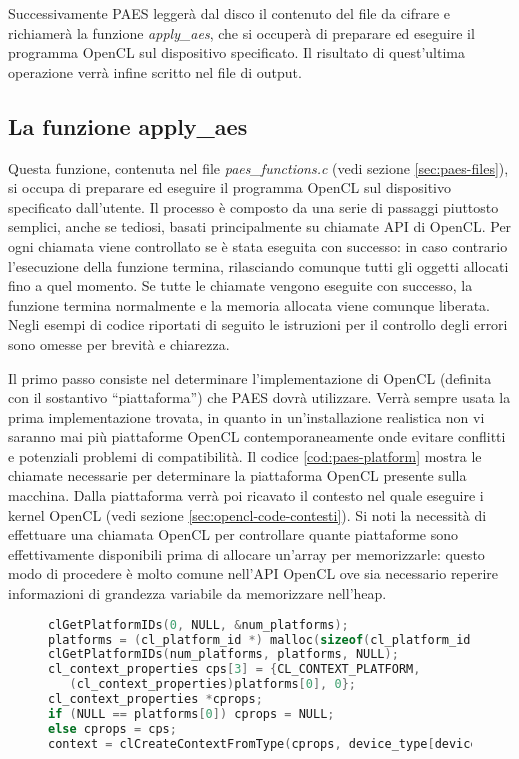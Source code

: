 \documentclass[12pt,a4paper,oneside]{book}
\begin{document}
Successivamente PAES leggerà dal disco il contenuto del file da cifrare e richiamerà la funzione \textit{apply\_aes}, che si occuperà di preparare ed eseguire il programma \ac{OpenCL} sul dispositivo specificato. Il risultato di quest'ultima operazione verrà infine scritto nel file di output.

\subsection{La funzione apply\_aes}
\label{sec:paes-apply-aes}

Questa funzione, contenuta nel file \textit{paes\_functions.c} (vedi sezione \ref{sec:paes-files}), si occupa di preparare ed eseguire il programma \ac{OpenCL} sul dispositivo specificato dall'utente. Il processo è composto da una serie di passaggi piuttosto semplici, anche se tediosi, basati principalmente su chiamate \ac{API} di \ac{OpenCL}. Per ogni chiamata viene controllato se è stata eseguita con successo: in caso contrario l'esecuzione della funzione termina, rilasciando comunque tutti gli oggetti allocati fino a quel momento. Se tutte le chiamate vengono eseguite con successo, la funzione termina normalmente e la memoria allocata viene comunque liberata. Negli esempi di codice riportati di seguito le istruzioni per il controllo degli errori sono omesse per brevità e chiarezza.

Il primo passo consiste nel determinare l'implementazione di \ac{OpenCL} (definita con il sostantivo ``piattaforma'') che PAES dovrà utilizzare. Verrà sempre usata la prima implementazione trovata, in quanto in un'installazione realistica non vi saranno mai più piattaforme \ac{OpenCL} contemporaneamente onde evitare conflitti e potenziali problemi di compatibilità. Il codice \ref{cod:paes-platform} mostra le chiamate necessarie per determinare la piattaforma \ac{OpenCL} presente sulla macchina. Dalla piattaforma verrà poi ricavato il contesto nel quale eseguire i kernel \ac{OpenCL} (vedi sezione \ref{sec:opencl-code-contesti}). Si noti la necessità di effettuare una chiamata \ac{OpenCL} per controllare quante piattaforme sono effettivamente disponibili prima di allocare un'array per memorizzarle: questo modo di procedere è molto comune nell'\ac{API} \ac{OpenCL} ove sia necessario reperire informazioni di grandezza variabile da memorizzare nell'heap.

\begin{figure}
\begin{lstlisting}[caption={\textit{Scelta dell'implementazione di \ac{OpenCL} da utilizzare.}},label={cod:paes-platform},language=C]
clGetPlatformIDs(0, NULL, &num_platforms);
platforms = (cl_platform_id *) malloc(sizeof(cl_platform_id) * num_platforms);
clGetPlatformIDs(num_platforms, platforms, NULL);	
cl_context_properties cps[3] = {CL_CONTEXT_PLATFORM,
   (cl_context_properties)platforms[0], 0};
cl_context_properties *cprops;
if (NULL == platforms[0]) cprops = NULL;
else cprops = cps;
context = clCreateContextFromType(cprops, device_type[device], NULL, NULL, &error);
\end{lstlisting}
\end{figure}
\end{document}
